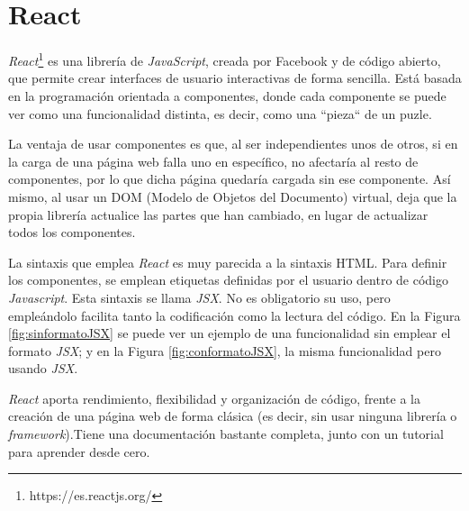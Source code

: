 	
	
	
\section{React}
\label{cap4:sec:react}

	\textit{React}\footnote{https://es.reactjs.org/} es una librer\'ia de \textit{JavaScript}, creada por Facebook y de c\'odigo abierto, que permite crear interfaces de usuario interactivas de forma sencilla. Est\'a basada en la programaci\'on orientada a componentes, donde cada componente se puede ver como una funcionalidad distinta, es decir, como una ``pieza`` de un puzle.
	
	La ventaja de usar componentes es que, al ser independientes unos de otros, si en la carga de una p\'agina web falla uno en espec\'ifico, no afectar\'ia al resto de componentes, por lo que dicha p\'agina quedar\'ia cargada sin ese componente. As\'i mismo, al usar un DOM (Modelo de Objetos del Documento) virtual, deja que la propia librer\'ia actualice las partes que han cambiado, en lugar de actualizar todos los componentes.
	
	La sintaxis que emplea \textit{React} es muy parecida a la sintaxis HTML. Para definir los componentes, se emplean etiquetas definidas por el usuario dentro de c\'odigo \textit{Javascript}. Esta sintaxis se llama \textit{JSX}. No es obligatorio su uso, pero emple\'andolo facilita tanto la codificaci\'on como la lectura del c\'odigo. En la Figura \ref{fig:sinformatoJSX} se puede ver un ejemplo de una funcionalidad sin emplear el formato \textit{JSX}; y en la Figura \ref{fig:conformatoJSX}, la misma funcionalidad pero usando \textit{JSX}.
	
	
	
	\textit{React} aporta rendimiento, flexibilidad y organizaci\'on de c\'odigo, frente a la creaci\'on de una p\'agina web de forma cl\'asica (es decir, sin usar ninguna librer\'ia o \textit{framework}).Tiene una documentaci\'on bastante completa, junto con un tutorial para aprender desde cero.
	

